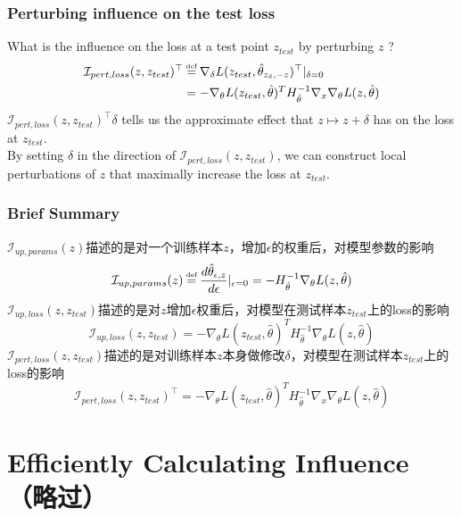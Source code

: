 \documentclass[UTF8]{beamer}
\newcommand\myeq{\stackrel{\mathclap{\tiny\mbox{def}}}{=}}
\begin{document}
\begin{frame}
\frametitle{Perturbing influence on the test loss}
What is the influence on the loss at a test point $z_{test}$ by perturbing $z$ ?
\begin{align}
\mathcal{I}_{pert, loss}(z, z_{test})^\top &\myeq \nabla_{\delta}L(z_{test}, \hat\theta_{z_\delta, -z})^\top\vert_{\delta=0} \nonumber\\
&= -\nabla_{\theta}L(z_{test}, \hat\theta)^TH_{\hat\theta}^{-1}\nabla_x\nabla_{\theta}L(z, \hat\theta)
\end{align}
$\mathcal{I}_{pert, loss}(z, z_{test})^\top\delta$ tells us the approximate effect that $z\mapsto z+\delta$ has on the loss at $z_{test}$.\\
By setting $\delta$ in the direction of $\mathcal{I}_{pert, loss}(z, z_{test})$, we can construct local perturbations of $z$ that maximally increase the loss at $z_{test}$.
\end{frame}
\begin{frame}
\frametitle{Brief Summary}
$\mathcal{I}_{up,params}(z)$描述的是对一个训练样本$z$，增加$\epsilon$的权重后，对模型参数的影响
\begin{equation}
\mathcal{I}_{up,params}(z)\myeq\frac{d\hat{\theta}_{\epsilon, z}}{d\epsilon}\vert_{\epsilon=0} = -H^{-1}_{\hat{\theta}}\nabla_\theta{}L(z, \hat{\theta}) \nonumber
\end{equation}
$\mathcal{I}_{up,loss}(z, z_{test})$描述的是对$z$增加$\epsilon$权重后，对模型在测试样本$z_{test}$上的loss的影响
\begin{equation}
\mathcal{I}_{up,loss}(z, z_{test}) = -\nabla_\theta{}L(z_{test}, \hat\theta)^TH_{\hat\theta}^{-1}\nabla_{\theta}L(z, \hat\theta) \nonumber
\end{equation}
$\mathcal{I}_{pert, loss}(z, z_{test})$描述的是对训练样本$z$本身做修改$\delta$，对模型在测试样本$z_{test}$上的loss的影响
\begin{equation}
\mathcal{I}_{pert, loss}(z, z_{test})^\top = -\nabla_{\theta}L(z_{test}, \hat\theta)^TH_{\hat\theta}^{-1}\nabla_x\nabla_{\theta}L(z, \hat\theta) \nonumber
\end{equation}
\end{frame}
\section{Efficiently Calculating Influence（略过）}
\frame{\tableofcontents[currentsection, sectionstyle=show/shaded]}
\end{document}
